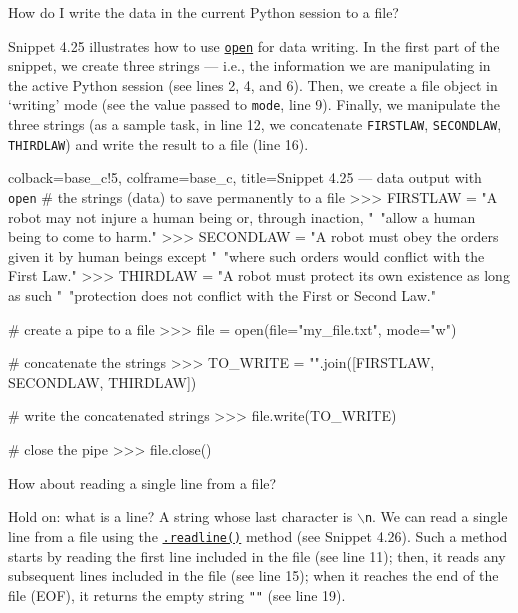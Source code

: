 \documentclass[a4paper,11pt]{book}
\newcommand{\question}[1]{%
    \begin{tcolorbox}[colback=comp_c!10,colframe=comp_c,sidebyside align=top,width=\linewidth,before skip=1ex]
        #1
    \end{tcolorbox}
    \switchcolumn%
}
\newcommand{\note}[1]{%
    \begin{tcolorbox}[colback=white!0,colframe=white!10,width=\linewidth,before skip=1ex]
        #1
    \end{tcolorbox}
}
\begin{document}
\begin{paracol}{2}
\question{\raggedright How do I write the data in the current Python session to a file?}
\note{Snippet 4.25 illustrates how to use \href{https://docs.python.org/3/library/functions.html\#open}{\texttt{open}} for data writing. In the first part of the snippet, we create three strings --- i.e., the information we are manipulating in the active Python session (see lines 2, 4, and 6). Then, we create a file object in `writing' mode (see the value passed to \texttt{mode}, line 9). Finally, we manipulate the three strings (as a sample task, in line 12, we concatenate \texttt{FIRSTLAW}, \texttt{SECONDLAW}, \texttt{THIRDLAW}) and write the result to a file (line 16).}
\end{paracol}

\begin{pythoncode}[linenos=true,]{colback=base_c!5, colframe=base_c, title=\sffamily Snippet 4.25 --- data output with \texttt{open}}
# the strings (data) to save permanently to a file
>>> FIRSTLAW = "A robot may not injure a human being or, through inaction, "\
	       "allow a human being to come to harm."
>>> SECONDLAW = "A robot must obey the orders given it by human beings except "\
	       "where such orders would conflict with the First Law."
>>> THIRDLAW = "A robot must protect its own existence as long as such "\
               "protection does not conflict with the First or Second Law."

# create a pipe to a file
>>> file = open(file="my_file.txt", mode="w")

# concatenate the strings
>>> TO_WRITE = "\n".join([FIRSTLAW, SECONDLAW, THIRDLAW])

# write the concatenated strings 
>>> file.write(TO_WRITE)

# close the pipe
>>> file.close()
\end{pythoncode}
\clearpage
	
\begin{paracol}{2}
	\question{\raggedright How about reading a single line from a file?}
	\note{Hold on: what is a line? A string whose last character is \texttt{$\backslash$n}. We can read a single line from a file using the \href{https://docs.python.org/3/tutorial/inputoutput.html\#methods-of-file-objects}{\texttt{.readline()}} method (see Snippet 4.26). Such a method starts by reading the first line included in the file (see line 11); then, it reads any subsequent lines included in the file (see line 15); when it reaches the end of the file (EOF), it returns the empty string \texttt{""} (see line 19).}
\end{paracol}
\end{document}
